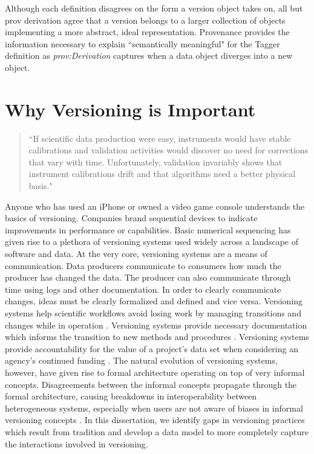 Although each definition disagrees on the form a version object takes on, all but \gls{prov} derivation agree that a version belongs to a larger collection of objects implementing a more abstract, ideal representation.
Provenance provides the information necessary to explain ``semantically meaningful" for the Tagger definition as \textit{prov:Derivation} captures when a data object diverges into a new object.

\section{Why Versioning is Important}

\begin{quotation}
	``If scientific data production were easy, instruments would
	have stable calibrations and validation activities would discover no need for
	corrections that vary with time. Unfortunately, validation invariably shows that
	instrument calibrations drift and that algorithms need a better physical basis." \cite{Barkstrom2003}
\end{quotation}

Anyone who has used an iPhone or owned a video game console understands the basics of versioning.
Companies brand sequential devices to indicate improvements in performance or capabilities.
Basic numerical sequencing has given rise to a plethora of versioning systems used widely across a landscape of software and data.
At the very core, versioning systems are a means of communication.
Data producers communicate to consumers how much the producer has changed the data.
The producer can also communicate through time using logs and other documentation.
In order to clearly communicate changes, ideas must be clearly formalized and defined and vice versa.
Versioning systems help scientific workflows avoid losing work by managing transitions and changes while in operation \cite{Casati1996}.
Versioning systems provide necessary documentation which informs the transition to new methods and procedures \cite{Wiil:2000:RDH:338407.338517}.
Versioning systems provide accountability for the value of a project's data set when considering an agency's continued funding \cite{Cavanaugh2002}.
The natural evolution of versioning systems, however, have given rise to formal architecture operating on top of very informal concepts.
Disagreements between the informal concepts propagate through the formal architecture, causing breakdowns in interoperability between heterogeneous systems, especially when users are not aware of biases in informal versioning concepts \cite{Baker2009}.
In this dissertation, we identify gaps in versioning practices which result from tradition and develop a data model to more completely capture the interactions involved in versioning.

